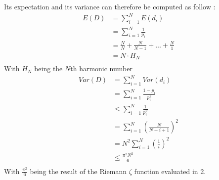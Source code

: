 Its expectation and its variance can therefore be computed as follow \cite{Mitzenmacher:2005:PCR:1076315}:
\begin{equation}
    \label{eqn:expectationD}
    \begin{split}
        E(D) & = \sum_{i=1}^N E(d_i) \\
    & = \sum_{i=1}^N \frac{1}{p_i} \\ 
    & = \frac{N}{N} +\frac{N}{N-1}+\dots+\frac{N}{1} \\
    & = N\cdot H_N \\
\end{split}
\end{equation}
With $H_N$ being the $N$th harmonic number
\begin{equation}
    \label{eqn:varD}
    \begin{split}
    Var(D) & = \sum_{i=1}^N Var(d_i) \\
    & = \sum_{i=1}^N \frac{1-p_i}{p_i^2}\\
    & \le \sum_{i=1}^N \frac{1}{p_i^2}\\
    & = \sum_{i=1}^N \left(\frac{N}{N - i+1}\right) ^2\\
    & = N^2 \sum_{i=1}^N \left( \frac{1}{i}\right) ^2\\
    & \le \frac{\pi ^2N^2}{6}\\
    \end{split}
\end{equation}
With $\frac{\pi^2}{6}$ being the result of the Riemann $\zeta$ function evaluated in 2.


